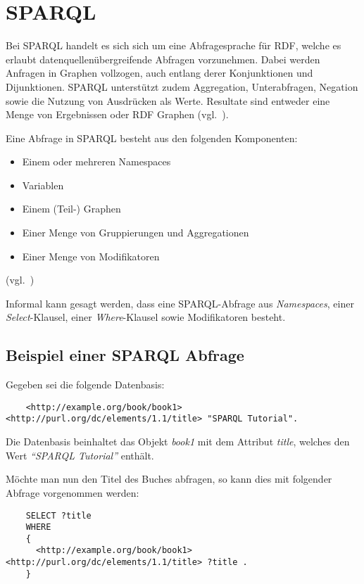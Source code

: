 \chapter{SPARQL}
\label{chap:sparql}

Bei SPARQL handelt es sich sich um eine Abfragesprache für RDF, welche es erlaubt datenquellenübergreifende Abfragen vorzunehmen. Dabei werden Anfragen in Graphen vollzogen, auch entlang derer Konjunktionen und Dijunktionen. SPARQL unterstützt zudem Aggregation, Unterabfragen, Negation sowie die Nutzung von Ausdrücken als Werte. Resultate sind entweder eine Menge von Ergebnissen oder RDF Graphen (vgl.~\cite[Abstract]{w3sparql_querylang}).

Eine Abfrage in SPARQL besteht aus den folgenden Komponenten:
\begin{itemize}
    \item Einem oder mehreren Namespaces
    \item Variablen
    \item Einem (Teil-) Graphen
    \item Einer Menge von Gruppierungen und Aggregationen
    \item Einer Menge von Modifikatoren
\end{itemize}
(vgl.~\cite[18.1.10 SPARQL Query]{w3sparql_querylang})

Informal kann gesagt werden, dass eine SPARQL-Abfrage aus \textit{Namespaces}, einer \textit{Select}-Klausel, einer \textit{Where}-Klausel sowie Modifikatoren besteht.

\section{Beispiel einer SPARQL Abfrage}
\label{sec:sparql_beispiel}

Gegeben sei die folgende Datenbasis:
\lstset{language=XML}
\begin{lstlisting}
    <http://example.org/book/book1> <http://purl.org/dc/elements/1.1/title> "SPARQL Tutorial".
\end{lstlisting}

Die Datenbasis beinhaltet das Objekt \textit{book1} mit dem Attribut \textit{title}, welches den Wert \textit{``SPARQL Tutorial''} enthält.

Möchte man nun den Titel des Buches abfragen, so kann dies mit folgender Abfrage vorgenommen werden:
\begin{lstlisting}
    SELECT ?title
    WHERE
    {
      <http://example.org/book/book1> <http://purl.org/dc/elements/1.1/title> ?title .
    }
\end{lstlisting}

